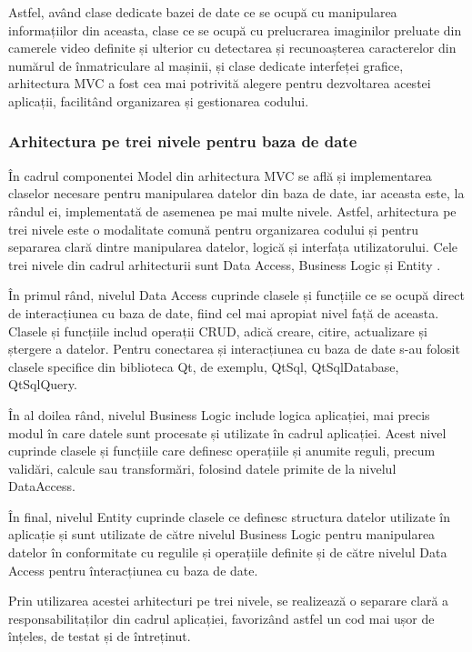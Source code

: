\documentclass[12pt]{article}
\begin{document}
Astfel, av\^{a}nd clase dedicate bazei de date ce se ocup\u{a} cu manipularea informațiilor din aceasta, clase ce se ocup\u{a} cu prelucrarea imaginilor preluate din camerele video definite și ulterior cu detectarea și recunoașterea caracterelor din num\u{a}rul de \^{i}nmatriculare al mașinii, și clase dedicate interfeței grafice, arhitectura MVC a fost cea mai potrivit\u{a} alegere pentru dezvoltarea acestei aplicații, facilit\^{a}nd organizarea și gestionarea codului.

\subsubsection{Arhitectura pe trei nivele pentru baza de date}

\^{I}n cadrul componentei Model din arhitectura MVC se afl\u{a} și implementarea claselor necesare pentru manipularea datelor din baza de date, iar aceasta este, la r\^{a}ndul ei, implementat\u{a} de asemenea pe mai multe nivele. Astfel, arhitectura pe trei nivele este o modalitate comun\u{a} pentru organizarea codului și pentru separarea clar\u{a} dintre manipularea datelor, logic\u{a} și interfața utilizatorului. Cele trei nivele din cadrul arhitecturii sunt Data Access, Business Logic și Entity \cite{threelayer}.

\^{I}n primul r\^{a}nd, nivelul Data Access cuprinde clasele și funcțiile ce se ocup\u{a} direct de interacțiunea cu baza de date, fiind cel mai apropiat nivel faț\u{a} de aceasta. Clasele și funcțiile includ operații CRUD, adic\u{a} creare, citire, actualizare și ștergere a datelor. Pentru conectarea și interacțiunea cu baza de date s-au folosit clasele specifice din biblioteca Qt, de exemplu, QtSql, QtSqlDatabase, QtSqlQuery.

\^{I}n al doilea r\^{a}nd, nivelul Business Logic include logica aplicației, mai precis modul \^{i}n care datele sunt procesate și utilizate \^{i}n cadrul aplicației. Acest nivel cuprinde clasele și funcțiile care definesc operațiile și anumite reguli, precum valid\u{a}ri, calcule sau transform\u{a}ri, folosind datele primite de la nivelul DataAccess.

\^{I}n final, nivelul Entity cuprinde clasele ce definesc structura datelor utilizate \^{i}n aplicație și sunt utilizate de c\u{a}tre nivelul Business Logic pentru manipularea datelor \^{i}n conformitate cu regulile și operațiile definite și de c\u{a}tre nivelul Data Access pentru \^{i}nteracțiunea cu baza de date.

Prin utilizarea acestei arhitecturi pe trei nivele, se realizeaz\u{a} o separare clar\u{a} a responsabilitaților din cadrul aplicației, favoriz\^{a}nd astfel un cod mai ușor de \^{i}nțeles, de testat și de \^{i}ntreținut.
\end{document}
